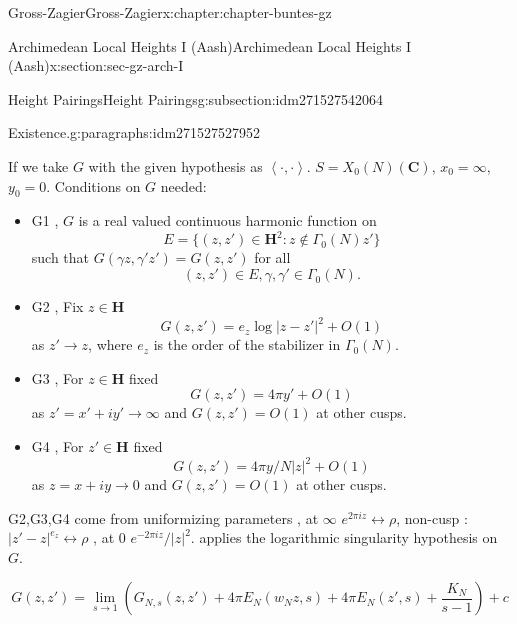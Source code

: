\documentclass[oneside,10pt,]{book}
\numberwithin{equation}{section}
\newcommand{\pair}[2]{\left\langle #1, #2 \right\rangle}
\newcommand{\CC}{\mathbf{C}}
\newcommand{\HH}{\mathbf{H}}
\begin{document}
\begin{chapterptx}{Gross-Zagier}{}{Gross-Zagier}{}{}{x:chapter:chapter-buntes-gz}
\begin{sectionptx}{Archimedean Local Heights I (Aash)}{}{Archimedean Local Heights I (Aash)}{}{}{x:section:sec-gz-arch-I}
\begin{subsectionptx}{Height Pairings}{}{Height Pairings}{}{}{g:subsection:idm271527542064}
\begin{paragraphs}{Existence.}{g:paragraphs:idm271527527952}
\begin{equation*}
\end{equation*}
%
\par
If we take \(G\) with the given hypothesis as \(\pair\cdot\cdot\). \(S  = X_0(N)(\CC)\), \(x_0 = \infty \), \(y_0 = 0\). Conditions on \(G\) needed:%
\begin{itemize}[label=\textbullet]
\item{}G1 , \(G\) is a real valued continuous harmonic function on%
\begin{equation*}
E = \{ (z,z') \in \HH^2 : z\not \in \Gamma _0(N) z'\}
\end{equation*}
such that \(G(\gamma  z, \gamma 'z') = G(z,z')\) for all%
\begin{equation*}
(z,z')\in E, \gamma ,\gamma '\in \Gamma _0(N)\text{.}
\end{equation*}
%
\item{}G2 , Fix \(z\in \HH\)%
\begin{equation*}
G(z,z') = e_z\log|z- z'|^2 + O(1)
\end{equation*}
as \(z'\to z\), where \(e_z\) is the order of the stabilizer in \(\Gamma _0(N)\).%
\item{}G3 , For \(z\in \HH\) fixed%
\begin{equation*}
G(z,z') = 4\pi  y' + O(1)
\end{equation*}
as \(z' = x' + iy' \to \infty \) and \(G(z,z') = O(1)\) at other cusps.%
\item{}G4 , For \(z'\in \HH\) fixed%
\begin{equation*}
G(z,z') = 4\pi  y/N|z|^2 + O(1)
\end{equation*}
as \(z = x + iy \to 0 \) and \(G(z,z') = O(1)\) at other cusps.%
\end{itemize}
%
\par
G2,G3,G4 come from uniformizing parameters , at \(\infty \) \(e^{2\pi i z} \leftrightarrow \rho \), non-cusp : \(|z' -z|^{e_z} \leftrightarrow \rho \) , at 0 \(e^{-2\pi i z}/|z|^2\). applies the logarithmic singularity hypothesis on \(G\).%
\par
%
\begin{equation*}
G(z,z') = \lim_{s\to 1} \left( G_{N,s} (z,z') + 4 \pi  E_N(w_N z, s) + 4 \pi  E_N(z', s) + \frac{K_N}{s-1}\right) + c
\end{equation*}
%
\end{paragraphs}%
\end{subsectionptx}
\end{sectionptx}
%
%
\typeout{************************************************}

\end{chapterptx}
\end{document}
